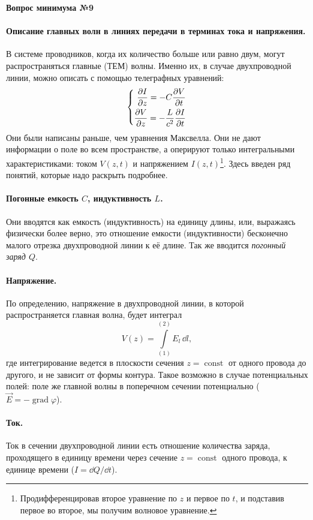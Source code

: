 \documentclass[a4paper,14pt]{extarticle}
\DeclareMathOperator{\Grad}{grad}
\DeclareMathOperator{\const}{const}
\renewcommand{\phi}{\varphi}
\newcommand{\ticket}[1] {
\newpage
\hypertarget{num#1}{}
\begin{center}
	\textbf{Вопрос минимума №#1 }
\end{center}
}
\begin{document}
\ticket{9}
\paragraph{Описание главных волн в линиях передачи в терминах тока и напряжения. } В системе проводников, когда их количество больше или равно двум, могут распространяться главные (ТЕМ) волны. Именно их, в случае двухпроводной линии, можно описать с помощью телеграфных уравнений:
\begin{equation}
	\left\{\begin{aligned}
		\pdv{I}{z} = -C\pdv{V}{t}\\
		\pdv{V}{z} = -\frac{L}{c^2} \pdv{I}{t}
	\end{aligned}\right.
\end{equation}
Они были написаны раньше, чем уравнения Максвелла. Они не дают информации о поле во всем пространстве, а оперируют только интегральными характеристиками: током $V(z,t)$ и напряжением $I(z,t)$\footnote{Продифференцировав второе уравнение по $z$ и первое по $t$, и подставив первое во второе, мы получим волновое уравнение.}.
Здесь введен ряд понятий, которые надо раскрыть подробнее.

\paragraph{Погонные емкость $C$, индуктивность $L$.} Они вводятся как емкость (индуктивность) на единицу длины, или, выражаясь физически более верно, это отношение емкости (индуктивности) бесконечно малого отрезка двухпроводной линии к её длине. Так же вводится \textit{погонный заряд $Q$}.

\paragraph{Напряжение. } По определению, напряжение в двухпроводной линии, в которой распространяется главная волна, будет интеграл
\begin{equation}
	V(z) = \int\limits_{(1)}^{(2)} E_l\, \dd l,
\end{equation}
где интегрирование ведется в плоскости сечения $z=\const$ от одного провода до другого, и не зависит от формы контура.
Такое возможно в случае потенциальных полей: поле же главной волны в поперечном сечении потенциально ($\vec{E}=-\Grad
\phi$).

\paragraph{Ток. } Ток в сечении двухпроводной линии есть отношение количества заряда, проходящего в единицу времени через сечение $z=\const$ одного провода, к единице времени ($I=\dd{Q}/\dd{t}$). 
\end{document}
